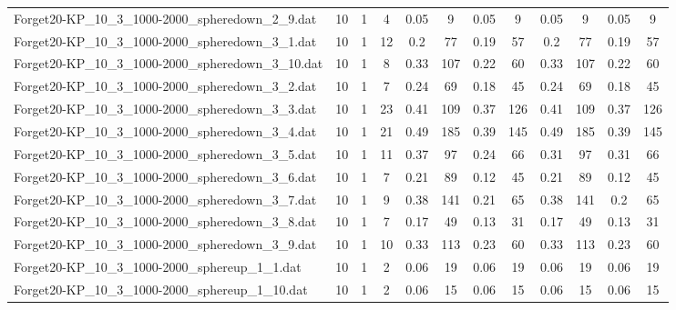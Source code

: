 \begin{sidewaystable}[!ht]
{\begin{tabular}{lccccccccccc}
Forget20-KP\_10\_3\_1000-2000\_spheredown\_2\_9.dat & 10 & 1 & 4 &  \textcolor{blue2}{0.05} & 9 &  \textcolor{blue2}{0.05} & 9 &  \textcolor{blue2}{0.05} & 9 &  \textcolor{blue2}{0.05} & 9 \\
Forget20-KP\_10\_3\_1000-2000\_spheredown\_3\_1.dat & 10 & 1 & 12 & 0.2 & 77 &  \textcolor{blue2}{0.19} & 57 & 0.2 & 77 &  \textcolor{blue2}{0.19} & 57 \\
Forget20-KP\_10\_3\_1000-2000\_spheredown\_3\_10.dat & 10 & 1 & 8 & 0.33 & 107 &  \textcolor{blue2}{0.22} & 60 & 0.33 & 107 &  \textcolor{blue2}{0.22} & 60 \\
Forget20-KP\_10\_3\_1000-2000\_spheredown\_3\_2.dat & 10 & 1 & 7 & 0.24 & 69 &  \textcolor{blue2}{0.18} & 45 & 0.24 & 69 &  \textcolor{blue2}{0.18} & 45 \\
Forget20-KP\_10\_3\_1000-2000\_spheredown\_3\_3.dat & 10 & 1 & 23 & 0.41 & 109 &  \textcolor{blue2}{0.37} & 126 & 0.41 & 109 &  \textcolor{blue2}{0.37} & 126 \\
Forget20-KP\_10\_3\_1000-2000\_spheredown\_3\_4.dat & 10 & 1 & 21 & 0.49 & 185 &  \textcolor{blue2}{0.39} & 145 & 0.49 & 185 &  \textcolor{blue2}{0.39} & 145 \\
Forget20-KP\_10\_3\_1000-2000\_spheredown\_3\_5.dat & 10 & 1 & 11 & 0.37 & 97 &  \textcolor{blue2}{0.24} & 66 & 0.31 & 97 & 0.31 & 66 \\
Forget20-KP\_10\_3\_1000-2000\_spheredown\_3\_6.dat & 10 & 1 & 7 & 0.21 & 89 &  \textcolor{blue2}{0.12} & 45 & 0.21 & 89 &  \textcolor{blue2}{0.12} & 45 \\
Forget20-KP\_10\_3\_1000-2000\_spheredown\_3\_7.dat & 10 & 1 & 9 & 0.38 & 141 & 0.21 & 65 & 0.38 & 141 &  \textcolor{blue2}{0.2} & 65 \\
Forget20-KP\_10\_3\_1000-2000\_spheredown\_3\_8.dat & 10 & 1 & 7 & 0.17 & 49 &  \textcolor{blue2}{0.13} & 31 & 0.17 & 49 &  \textcolor{blue2}{0.13} & 31 \\
Forget20-KP\_10\_3\_1000-2000\_spheredown\_3\_9.dat & 10 & 1 & 10 & 0.33 & 113 &  \textcolor{blue2}{0.23} & 60 & 0.33 & 113 &  \textcolor{blue2}{0.23} & 60 \\
Forget20-KP\_10\_3\_1000-2000\_sphereup\_1\_1.dat & 10 & 1 & 2 &  \textcolor{blue2}{0.06} & 19 &  \textcolor{blue2}{0.06} & 19 &  \textcolor{blue2}{0.06} & 19 &  \textcolor{blue2}{0.06} & 19 \\
Forget20-KP\_10\_3\_1000-2000\_sphereup\_1\_10.dat & 10 & 1 & 2 &  \textcolor{blue2}{0.06} & 15 &  \textcolor{blue2}{0.06} & 15 &  \textcolor{blue2}{0.06} & 15 &  \textcolor{blue2}{0.06} & 15 \\

\end{tabular}}
\end{sidewaystable}
